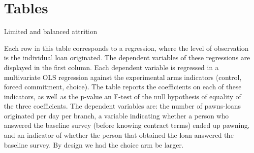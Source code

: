 \documentclass[oneside,11pt]{article}
\begin{document}



\newpage


\clearpage

%
%






\newpage
\singlespacing

\section{Tables}

\begin{table}[H]
\caption{Limited and balanced attrition}
\label{attrition_table}
\begin{center}
\scriptsize{}
\end{center}
 \scriptsize Each row in this table 
 corresponds to a regression, where the level of observation is the individual loan originated. The dependent variables of these regressions are displayed in the first column. Each dependent variable is regressed in a multivariate OLS regression against the experimental arms indicators (control, forced commitment, choice). The table reports the coefficients on each of these indicators, as well as the p-value an F-test of the null hypothesis of equality of the three coefficients. The dependent variables are: the number of pawns-loans originated per day per branch, a variable indicating whether a person who answered the baseline survey (before knowing contract terms) ended up pawning, and an indicator of whether the person that obtained the loan answered the baseline survey. By design we had the choice arm be larger.
\end{table}
\end{document}
